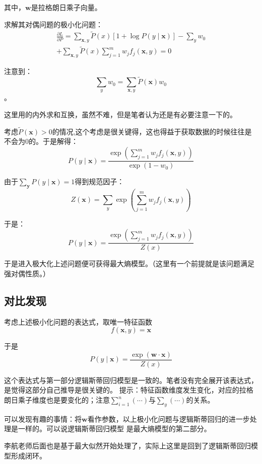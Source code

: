 \documentclass{article}
\begin{document}
        其中，$\boldsymbol{w}$是拉格朗日乘子向量。

        求解其对偶问题的极小化问题：
        \begin{align*}
            \frac{\partial L}{\partial P}=\sum_{\boldsymbol{x},y}\widetilde{P}(x)[1+\log P(y\mid\boldsymbol{x})]-\sum_{y}w_0 \\
            +\sum_{\boldsymbol{x},y}\widetilde{P}(x)\sum_{j=1}^{m}w_jf_j(\boldsymbol{x},y)=0
        \end{align*}

        注意到：
        \[\sum_{y}w_0=\sum_{\boldsymbol{x},y}\widetilde{P}(\boldsymbol{x})w_0\]。
        
        这里用的内外求和互换，虽然不难，但是笔者认为还是有必要注意一下的。

        考虑$\widetilde{P}(\boldsymbol{x})>0$的情况,这个考虑是很关键得，这也得益于获取数据的时候往往是不会为0的。于是解得：
        \[P(y \mid \boldsymbol{x})=\frac{\exp(\sum_{j=1}^{m}w_jf_j(\boldsymbol{x},y))}{\exp(1-w_0)}\]

        由于$\sum_{\boldsymbol{y}}P(y\mid\boldsymbol{x})=1$得到规范因子：
        \[Z(\boldsymbol{x})=\sum_{y}\exp(\sum_{j=1}^{m}w_jf_j(\boldsymbol{x},y))\]

        于是：
        \[P(y\mid\boldsymbol{x})=\frac{\exp(\sum_{j=1}^{m}w_jf_j(\boldsymbol{x},y))}{Z(x)}\]

        于是进入极大化上述问题便可获得最大熵模型。（这里有一个前提就是该问题满足强对偶性质。）

    \subsection*{对比发现}
        考虑上述极小化问题的表达式，取唯一特征函数
        \[f(\boldsymbol{x},y)=\boldsymbol{x}\]

        于是
        \[P(y\mid\boldsymbol{x})=\frac{\exp(\boldsymbol{w}\cdot\boldsymbol{x})}{Z(x)}\]

        这个表达式与第一部分逻辑斯蒂回归模型是一致的。笔者没有完全展开该表达式，是觉得这部分自己推导是很关键的。
        提示：特征函数维度发生变化，对应的拉格朗日乘子维度也是要变化的；注意$\sum_{i=1}^{n}(\cdots)$与$\sum_{y}(\cdots)$的关系。

        可以发现有趣的事情：将$\boldsymbol{w}$看作参数，以上极小化问题与逻辑斯蒂回归的进一步处理是一样的。可以说逻辑斯蒂回归模型
        是最大熵模型的第二部分。

        李航老师后面也是基于最大似然开始处理了，实际上这里是回到了逻辑斯蒂回归模型形成闭环。
\end{document}
